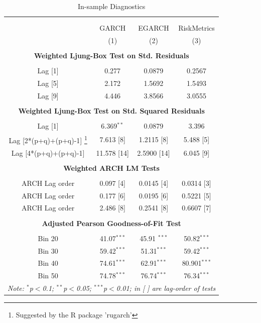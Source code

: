 \documentclass[a4paper]{article}
\begin{document}
\begin{table}[!htbp] \centering 
  \caption{In-sample Diagnostics} 
  \label{tab:diagnostic-risk} %
\begin{tabular}{@{\extracolsep{4pt}}cccc} 
\\[-1.8ex]\hline 
\hline \\[-1.8ex] 

\\[-1.8ex] & GARCH & EGARCH & RiskMetrics \\ 
& (1) & (2) & (3) \\ 
\hline \\[-1.8ex] 

\multicolumn{4}{c}{\textbf{Weighted Ljung-Box Test on Std. Residuals}}\\
\hline \\[-1.8ex] 
Lag [1] & 0.277 & 0.0879 & 0.2567 \\ 
Lag [5] & 2.172 & 1.5692 & 1.5493 \\ 
Lag [9] & 4.446 & 3.8566 & 3.0555 \\  
\hline \\[-1.8ex] 

\multicolumn{4}{c}{\textbf{Weighted Ljung-Box Test on Std. Squared Residuals}}\\
\hline \\[-1.8ex] 
Lag [1] & 6.369$^{**}$ & 0.0879 & 3.396 \\ 
Lag [2*(p+q)+(p+q)-1] \footnote{Suggested by the R package 'rugarch'} & 7.613 [8] & 1.2115 [8] & 5.488 [5] \\ 
Lag [4*(p+q)+(p+q)-1] & 11.578 [14] & 2.5900 [14] & 6.045 [9] \\
\hline \\[-1.8ex]

\multicolumn{4}{c}{\textbf{Weighted ARCH LM Tests}}\\
\hline \\[-1.8ex] 
ARCH Lag order & 0.097 [4] & 0.0145 [4]  & 0.0314 [3] \\ 
ARCH Lag order & 0.177 [6] & 0.0195 [6] & 0.5221 [5] \\ 
ARCH Lag order & 2.486 [8] & 0.2541 [8] & 0.6607 [7] \\
\hline \\[-1.8ex] 

\multicolumn{4}{c}{\textbf{Adjusted Pearson Goodness-of-Fit Test}}\\
\hline \\[-1.8ex] 
Bin 20 & 41.07$^{***}$ & 45.91 $^{***}$ & 50.82$^{***}$ \\ 
Bin 30 & 59.42$^{***}$ & 51.31$^{***}$ & 59.42$^{***}$ \\ 
Bin 40 & 74.61$^{***}$ & 62.91$^{***}$ & 80.901$^{***}$ \\
Bin 50 & 74.78$^{***}$ & 76.74$^{***}$ & 76.34$^{***}$ \\
\hline 
\multicolumn{4}{c}{\textit{Note: $^{*}$p$<$0.1; $^{**}$p$<$0.05; $^{***}$p$<$0.01; in [ ] are lag-order of tests}} 
\end{tabular} 
\end{table} 
\end{document}
